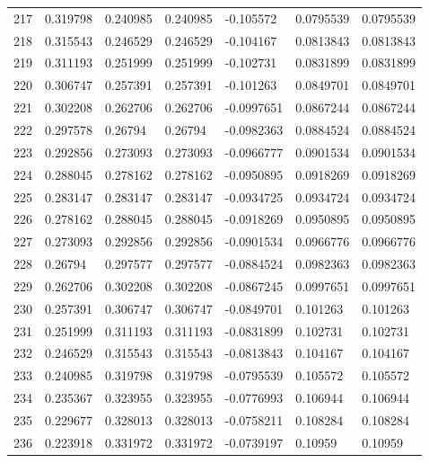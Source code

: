 \begin{longtable}{l|lll|lll}
 217 &  0.319798    & 0.240985    & 0.240985    & -0.105572    & 0.0795539   & 0.0795539   \\
 218 &  0.315543    & 0.246529    & 0.246529    & -0.104167    & 0.0813843   & 0.0813843   \\
 219 &  0.311193    & 0.251999    & 0.251999    & -0.102731    & 0.0831899   & 0.0831899   \\
 220 &  0.306747    & 0.257391    & 0.257391    & -0.101263    & 0.0849701   & 0.0849701   \\
 221 &  0.302208    & 0.262706    & 0.262706    & -0.0997651   & 0.0867244   & 0.0867244   \\
 222 &  0.297578    & 0.26794     & 0.26794     & -0.0982363   & 0.0884524   & 0.0884524   \\
 223 &  0.292856    & 0.273093    & 0.273093    & -0.0966777   & 0.0901534   & 0.0901534   \\
 224 &  0.288045    & 0.278162    & 0.278162    & -0.0950895   & 0.0918269   & 0.0918269   \\
 225 &  0.283147    & 0.283147    & 0.283147    & -0.0934725   & 0.0934724   & 0.0934724   \\
 226 &  0.278162    & 0.288045    & 0.288045    & -0.0918269   & 0.0950895   & 0.0950895   \\
 227 &  0.273093    & 0.292856    & 0.292856    & -0.0901534   & 0.0966776   & 0.0966776   \\
 228 &  0.26794     & 0.297577    & 0.297577    & -0.0884524   & 0.0982363   & 0.0982363   \\
 229 &  0.262706    & 0.302208    & 0.302208    & -0.0867245   & 0.0997651   & 0.0997651   \\
 230 &  0.257391    & 0.306747    & 0.306747    & -0.0849701   & 0.101263    & 0.101263    \\
 231 &  0.251999    & 0.311193    & 0.311193    & -0.0831899   & 0.102731    & 0.102731    \\
 232 &  0.246529    & 0.315543    & 0.315543    & -0.0813843   & 0.104167    & 0.104167    \\
 233 &  0.240985    & 0.319798    & 0.319798    & -0.0795539   & 0.105572    & 0.105572    \\
 234 &  0.235367    & 0.323955    & 0.323955    & -0.0776993   & 0.106944    & 0.106944    \\
 235 &  0.229677    & 0.328013    & 0.328013    & -0.0758211   & 0.108284    & 0.108284    \\
 236 &  0.223918    & 0.331972    & 0.331972    & -0.0739197   & 0.10959     & 0.10959     \\

\end{longtable}
